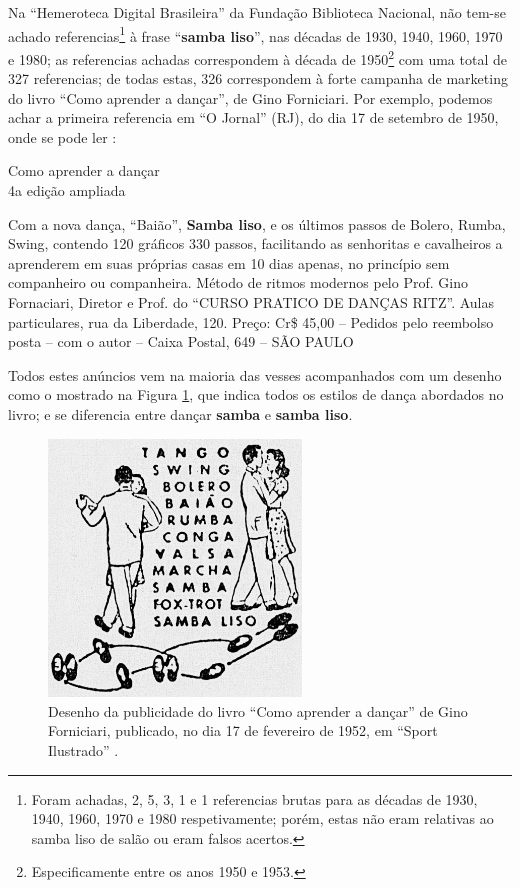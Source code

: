 

Na ``Hemeroteca Digital Brasileira'' da Fundação Biblioteca Nacional,
não tem-se achado referencias\footnote{ Foram achadas,
2, 5, 3, 1 e 1 referencias brutas para as décadas de 1930, 1940, 1960, 1970 e 1980 respetivamente;
porém, estas não eram relativas ao samba liso de salão ou eram falsos acertos.} 
à frase ``\textbf{samba liso}'', nas décadas de 1930, 1940, 1960, 1970 e 1980;
as referencias achadas correspondem à década de 1950\footnote{Especificamente entre os anos 1950 e 1953.}  
com uma total de 327 referencias;
de todas estas, 326 correspondem à forte campanha 
de marketing do livro
``Como aprender a dançar'', 
de Gino Forniciari. 
Por exemplo, podemos achar a primeira referencia em ``O Jornal'' (RJ),
do dia 17 de setembro de 1950, onde se pode ler \cite[3ra seção pp. 9]{jornalanunciodanca1}:
\begin{citando}
\begin{center}
Como aprender a dançar\\
4a edição ampliada
\end{center}
Com a nova dança, ``Baião'', \textbf{Samba liso}, e os
últimos passos de Bolero, Rumba, Swing, contendo
120 gráficos 330 passos, facilitando as senhoritas 
e cavalheiros a aprenderem em suas próprias 
casas em 10 dias apenas, no princípio sem
companheiro ou companheira. Método de ritmos modernos
pelo Prof. Gino Fornaciari, 
Diretor e Prof. do ``CURSO PRATICO DE DANÇAS RITZ''.
Aulas particulares, rua da Liberdade, 120.
Preço: Cr\$ 45,00 -- Pedidos pelo reembolso posta 
-- com o autor -- Caixa Postal, 649 -- SÃO PAULO 
\end{citando}
Todos estes anúncios vem na maioria das vesses acompanhados com um desenho como
o mostrado na Figura \ref{fig:desenholivrodanca1}, que indica todos os estilos de dança abordados no livro;
e se diferencia entre dançar \textbf{samba} e \textbf{samba liso}.
\begin{figure}[h]
  \centering
    \includegraphics[width=0.6\textwidth]{chapters/cap-historia-dancasamba/comoaprenderdancar.jpg}
  \caption{Desenho da publicidade do livro ``Como aprender a dançar'' de Gino Forniciari,
publicado, no dia 17 de fevereiro de 1952, em ``Sport Ilustrado'' \cite[pp. 22]{sportlivropublidanca}.}
\label{fig:desenholivrodanca1}
\end{figure}
